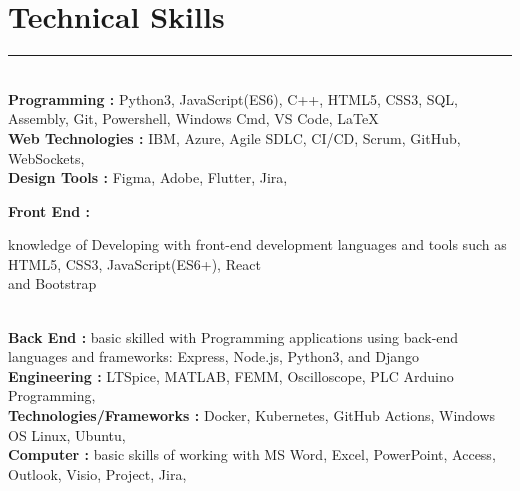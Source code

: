 \documentclass[12pt]{article}
\begin{document}
\vspace{-3mm}\section*{\fontsize{14}{1}\selectfont\color{color_29791}Technical Skills}\vspace{-9pt} 
\rule{\textwidth}{0.4pt}
\vspace{2pt}
\\{\fontsize{9}{1}\selectfont\color{color_29791}\hspace{5mm}\textbf{Programming :} Python3, JavaScript(ES6), C++, HTML5, CSS3, SQL, Assembly, Git, Powershell, Windows Cmd, VS Code, LaTeX}
\\{\fontsize{9}{1}\selectfont\color{color_29791}\hspace{5mm}\textbf{Web Technologies :} IBM, Azure, Agile SDLC, CI/CD, Scrum, GitHub, WebSockets,}
\\{\fontsize{9}{1}\selectfont\color{color_29791}\hspace{5mm}\textbf{Design Tools :} Figma, Adobe, Flutter, Jira,}
\\{\fontsize{9}{1}\selectfont\color{color_29791}\hspace{5mm}\textbf{Front End :} \parbox{\textwidth}{\raggedright knowledge of Developing with front-end development languages and tools such as HTML5, CSS3, JavaScript(ES6+), React \\ and Bootstrap}}
\\{\fontsize{9}{1}\selectfont\color{color_29791}\hspace{5mm}\textbf{Back End :} basic skilled with Programming applications using back-end languages and frameworks: Express, Node.js, Python3, and Django}
\\{\fontsize{9}{1}\selectfont\color{color_29791}\hspace{5mm}\textbf{Engineering :} LTSpice, MATLAB, FEMM, Oscilloscope, PLC Arduino Programming,}
\\{\fontsize{9}{1}\selectfont\color{color_29791}\hspace{5mm}\textbf{Technologies/Frameworks :} Docker, Kubernetes, GitHub Actions, Windows OS Linux, Ubuntu,}
\\{\fontsize{9}{1}\selectfont\color{color_29791}\hspace{5mm}\textbf{Computer :} basic skills of working with MS Word, Excel, PowerPoint, Access, Outlook, Visio, Project, Jira,}
\end{document}
